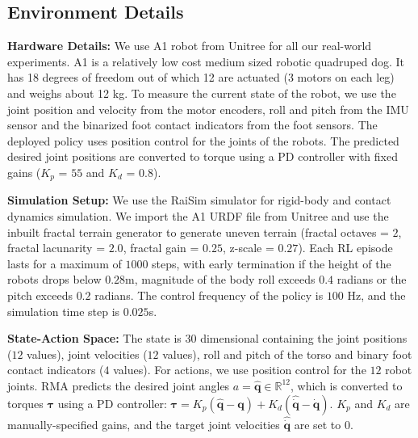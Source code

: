 \documentclass[conference]{IEEEtran}
\newcommand{\algo}{RMA}
\begin{document}
\subsection{Environment Details}
\label{subsec:env-details}
\noindent\textbf{Hardware Details:} We use A1 robot from Unitree for all our real-world experiments. A1 is a relatively low cost medium sized robotic quadruped dog. It has 18 degrees of freedom out of which 12 are actuated (3 motors on each leg) and weighs about 12 kg. To measure the current state of the robot, we use the joint position and velocity from the motor encoders, roll and pitch from the IMU sensor and the binarized foot contact indicators from the foot sensors. The deployed policy uses position control for the joints of the robots. The predicted desired joint positions are converted to torque using a PD controller with fixed gains ($K_p$ = $55$ and $K_d$ = $0.8$).

\vspace{0.6em}\noindent\textbf{Simulation Setup:} We use the RaiSim simulator \cite{raisim} for rigid-body and contact dynamics simulation. We import the A1 URDF file from Unitree \cite{unitree} and use the inbuilt fractal terrain generator to generate uneven terrain (fractal octaves = $2$, fractal lacunarity = $2.0$, fractal gain = $0.25$, z-scale = $0.27$). Each RL episode lasts for a maximum of $1000$ steps, with early termination if the height of the robots drops below $0.28$m, magnitude of the body roll exceeds $0.4$ radians or the pitch exceeds $0.2$ radians. The control frequency of the policy is $100$ Hz, and the simulation time step is $0.025$s.

\vspace{0.6em}\noindent\textbf{State-Action Space:} The state is $30$ dimensional containing the joint positions ($12$ values), joint velocities ($12$ values), roll and pitch of the torso and binary foot contact indicators ($4$ values). For actions,
we use position control for the $12$ robot joints. \algo{} predicts the desired joint angles $a = \hat{\mathbf{q}} \in \mathbb{R}^{12}$, which is converted to torques $\boldsymbol{\tau}$ using a PD controller: $\boldsymbol{\tau} = K_p \left(\hat{\mathbf{q}} - \mathbf{q}\right) + K_d \left(\hat{\dot{\mathbf{q}}} - \dot{\mathbf{q}}\right)$. $K_p$ and $K_d$ are manually-specified gains, and the target joint velocities $\hat{\dot{\mathbf{q}}}$ are set to 0. 
\end{document}
